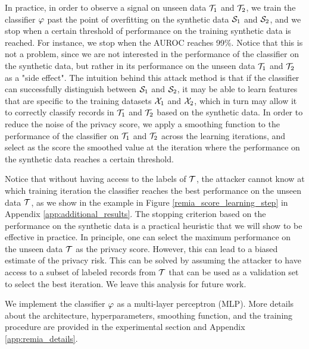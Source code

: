 In practice, in order to observe a signal on unseen data $\mathcal{T}_1$ and $\mathcal{T}_2$, we train the classifier $\varphi$ past the point of overfitting on the synthetic data $\mathcal{S}_1$ and $\mathcal{S}_2$, and we stop when a certain threshold of performance on the training synthetic data is reached. For instance, we stop when the AUROC reaches 99\%.
Notice that this is not a problem, since we are not interested in the performance of the classifier on the synthetic data, but rather in its performance on the unseen data $\mathcal{T}_1$ and $\mathcal{T}_2$ as a "side effect".
The intuition behind this attack method is that if the classifier can successfully distinguish between $\mathcal{S}_1$ and $\mathcal{S}_2$, it may be able to learn features that are specific to the training datasets $\mathcal{X}_1$ and $\mathcal{X}_2$, which in turn may allow it to correctly classify records in $\mathcal{T}_1$ and $\mathcal{T}_2$ based on the synthetic data.
In order to reduce the noise of the privacy score, we apply a smoothing function to the performance of the classifier on $\mathcal{T}_1$ and $\mathcal{T}_2$ across the learning iterations, and select as the score the smoothed value at the iteration where the performance on the synthetic data reaches a certain threshold.

Notice that without having access to the labels of $\mathcal{T}$, the attacker cannot know at which training iteration the classifier reaches the best performance on the unseen data $\mathcal{T}$, as we show in the example in Figure \ref{remia_score_learning_step} in Appendix \ref{app:additional_results}. The stopping criterion based on the performance on the synthetic data is a practical heuristic that we will show to be effective in practice. In principle, one can select the maximum performance on the unseen data $\mathcal{T}$ as the privacy score. However, this can lead to a biased estimate of the privacy risk. This can be solved by assuming the attacker to have access to a subset of labeled records from $\mathcal{T}$ that can be used as a validation set to select the best iteration. We leave this analysis for future work.

We implement the classifier $\varphi$ as a multi-layer perceptron (MLP). More details about the architecture, hyperparameters, smoothing function, and the training procedure are provided in the experimental section and Appendix \ref{app:remia_details}.




